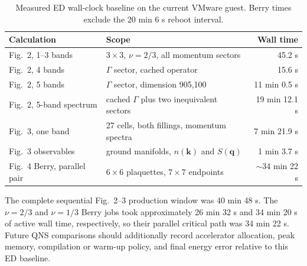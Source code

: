 \documentclass[10pt,twocolumn]{article}
\begin{document}
\begin{table}[t]
\centering
\caption{Measured ED wall-clock baseline on the current VMware guest.  Berry
times exclude the 20 min 6 s reboot interval.}
\label{tab:edruntime}
\begin{tabular}{@{}llr@{}}
\toprule
Calculation & Scope & Wall time \\
\midrule
Fig.~2, 1--3 bands & $3\times3$, $\nu=2/3$, all momentum sectors & 45.2 s \\
Fig.~2, 4 bands & $\Gamma$ sector, cached operator & 15.6 s \\
Fig.~2, 5 bands & $\Gamma$ sector, dimension 905,100 & 11 min 0.5 s \\
Fig.~2, 5-band spectrum & cached $\Gamma$ plus two inequivalent sectors & 19 min 12.1 s \\
Fig.~3, one band & 27 cells, both fillings, momentum spectra & 7 min 21.9 s \\
Fig.~3 observables & ground manifolds, $n(\bm k)$ and $S(\bm q)$ & 1 min 3.7 s \\
Fig.~4 Berry, parallel pair & $6\times6$ plaquettes, $7\times7$ endpoints & $\sim$34 min 22 s \\
\bottomrule
\end{tabular}
\end{table}

The complete sequential Fig.~2--3 production window was 40 min 48 s.  The
$\nu=2/3$ and $\nu=1/3$ Berry jobs took approximately 26 min 32 s and
34 min 20 s of active wall time, respectively, so their parallel critical path
was 34 min 22 s.  Future QNS comparisons should additionally record accelerator
allocation, peak memory, compilation or warm-up policy, and final energy error
relative to this ED baseline.
\end{document}
